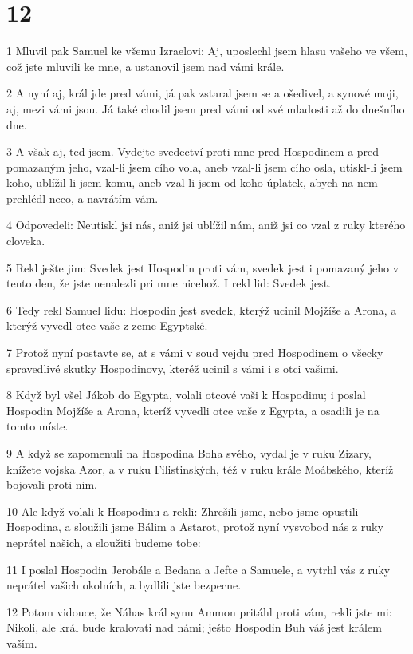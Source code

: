 \chapter{12}

\par 1 Mluvil pak Samuel ke všemu Izraelovi: Aj, uposlechl jsem hlasu vašeho ve všem, což jste mluvili ke mne, a ustanovil jsem nad vámi krále.
\par 2 A nyní aj, král jde pred vámi, já pak zstaral jsem se a ošedivel, a synové moji, aj, mezi vámi jsou. Já také chodil jsem pred vámi od své mladosti až do dnešního dne.
\par 3 A však aj, ted jsem. Vydejte svedectví proti mne pred Hospodinem a pred pomazaným jeho, vzal-li jsem cího vola, aneb vzal-li jsem cího osla, utiskl-li jsem koho, ublížil-li jsem komu, aneb vzal-li jsem od koho úplatek, abych na nem prehlédl neco, a navrátím vám.
\par 4 Odpovedeli: Neutiskl jsi nás, aniž jsi ublížil nám, aniž jsi co vzal z ruky kterého cloveka.
\par 5 Rekl ješte jim: Svedek jest Hospodin proti vám, svedek jest i pomazaný jeho v tento den, že jste nenalezli pri mne nicehož. I rekl lid: Svedek jest.
\par 6 Tedy rekl Samuel lidu: Hospodin jest svedek, kterýž ucinil Mojžíše a Arona, a kterýž vyvedl otce vaše z zeme Egyptské.
\par 7 Protož nyní postavte se, at s vámi v soud vejdu pred Hospodinem o všecky spravedlivé skutky Hospodinovy, kteréž ucinil s vámi i s otci vašimi.
\par 8 Když byl všel Jákob do Egypta, volali otcové vaši k Hospodinu; i poslal Hospodin Mojžíše a Arona, kteríž vyvedli otce vaše z Egypta, a osadili je na tomto míste.
\par 9 A když se zapomenuli na Hospodina Boha svého, vydal je v ruku Zizary, knížete vojska Azor, a v ruku Filistinských, též v ruku krále Moábského, kteríž bojovali proti nim.
\par 10 Ale když volali k Hospodinu a rekli: Zhrešili jsme, nebo jsme opustili Hospodina, a sloužili jsme Bálim a Astarot, protož nyní vysvobod nás z ruky neprátel našich, a sloužiti budeme tobe:
\par 11 I poslal Hospodin Jerobále a Bedana a Jefte a Samuele, a vytrhl vás z ruky neprátel vašich okolních, a bydlili jste bezpecne.
\par 12 Potom vidouce, že Náhas král synu Ammon pritáhl proti vám, rekli jste mi: Nikoli, ale král bude kralovati nad námi; ješto Hospodin Buh váš jest králem vaším.
